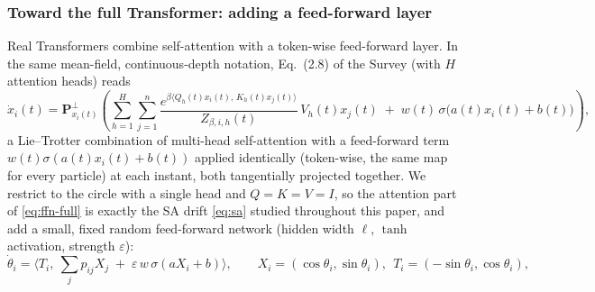 \documentclass[11pt]{article}
\begin{document}
\subsubsection{Toward the full Transformer: adding a feed-forward layer}
\label{sec:ffn}

Real Transformers combine self-attention with a token-wise feed-forward layer. In the same mean-field, continuous-depth notation, Eq.~(2.8) of the Survey (with $H$ attention heads) reads
\begin{equation}
    \dot x_i(t) = \mathbf{P}^\perp_{x_i(t)}\left(\sum_{h=1}^H\sum_{j=1}^n \frac{e^{\beta\langle Q_h(t)x_i(t),\,K_h(t)x_j(t)\rangle}}{Z_{\beta,i,h}(t)}\,V_h(t)x_j(t) \;+\; w(t)\,\sigma\big(a(t)x_i(t)+b(t)\big)\right),
    \label{eq:ffn-full}
\end{equation}
a Lie--Trotter combination of multi-head self-attention with a feed-forward term $w(t)\sigma(a(t)x_i(t)+b(t))$ applied identically (token-wise, the same map for every particle) at each instant, both tangentially projected together. We restrict to the circle with a single head and $Q=K=V=I$, so the attention part of \eqref{eq:ffn-full} is exactly the SA drift \eqref{eq:sa} studied throughout this paper, and add a small, fixed random feed-forward network (hidden width $\ell$, $\tanh$ activation, strength $\varepsilon$):
\begin{equation}
    \dot\theta_i = \Big\langle T_i,\ \textstyle\sum_j p_{ij}X_j \;+\; \varepsilon\, w\,\sigma(aX_i+b)\Big\rangle, \qquad X_i=(\cos\theta_i,\sin\theta_i),\ \ T_i=(-\sin\theta_i,\cos\theta_i),
    \label{eq:ffn-circle}
\end{equation}
\end{document}
